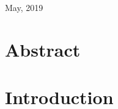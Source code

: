 \documentclass[11pt, twocolumn]{article}
\begin{document}
\begin{titlepage}
		
		\vfill\vfill\vfill %
		
		{\large May, 2019} %
		
		
		
		
		\vfill %
		
	\end{titlepage}

\newpage
\twocolumn

\section*{Abstract}

\section*{Introduction}
\end{document}
